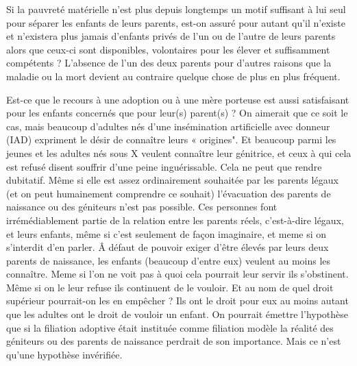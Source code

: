  Si la pauvreté matérielle n'est plus depuis longtemps un motif suffisant à lui seul pour séparer les enfants de leurs parents, est-on assuré pour autant qu'il n'existe et n'existera plus jamais d'enfants privés de l'un ou de l'autre de leurs parents alors que ceux-ci sont disponibles, volontaires pour les élever et suffisamment compétents ? L'absence de l'un des deux parents pour d'autres raisons que la maladie ou la mort devient au contraire quelque chose de plus en plus fréquent. 

 Est-ce que le recours à une adoption ou à une mère porteuse est aussi satisfaisant pour les enfants concernés que pour leur(s) parent(s) ? On aimerait que ce soit le cas, mais beaucoup d'adultes nés d'une insémination artificielle avec donneur (IAD) expriment le désir de connaître leurs « origines". Et beaucoup parmi les jeunes et les adultes nés sous X veulent connaître leur génitrice, et ceux à qui cela est refusé disent souffrir d'une peine inguérissable. Cela ne peut que rendre dubitatif. Même si elle est assez ordinairement souhaitée par les parents légaux (et on peut humainement comprendre ce souhait) l'évacuation des parents de naissance ou des géniteurs n'est pas possible. Ces personnes font irrémédiablement partie de la relation entre les parents réels, c'est-à-dire légaux, et leurs enfants, même si c'est seulement de façon imaginaire, et meme si on s'interdit d'en parler. Â défaut de pouvoir exiger d'être élevés par leurs deux parents de naissance, les enfants (beaucoup d'entre eux) veulent au moins les connaître.  Meme si l'on ne voit pas à quoi cela pourrait leur servir ils s'obstinent. Même si on le leur refuse ils continuent de le vouloir. Et au nom de quel droit supérieur pourrait-on les en empêcher ? Ils ont le droit pour eux au moins autant que les adultes ont le droit de vouloir un enfant. On pourrait émettre l'hypothèse que si la filiation adoptive était instituée comme filiation modèle la réalité des géniteurs ou des parents de naissance perdrait de son importance. Mais ce n'est qu'une hypothèse invérifiée.

